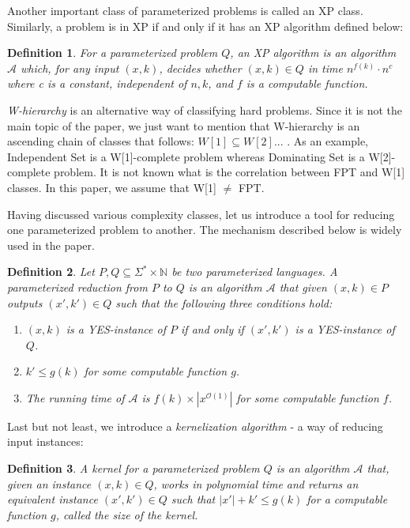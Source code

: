 \documentclass[en]{pracamgr}
\newtheorem{definition}{Definition}
\newcommand{\domsetp}{{\sc Dominating Set}}
\newcommand{\indset}{{\sc Independent Set}}
\begin{document}
Another important class of parameterized problems is called an XP class. Similarly, a problem is in XP if and only if it has an XP algorithm defined below:

\begin{definition}
	For a parameterized problem $Q$, an \textup{XP algorithm} is an algorithm $\mathcal{A}$ which, for any input $(x,k)$, decides whether $(x,k) \in Q$ in time $n^{f(k)}\cdot n^c$ where c is a constant, independent of $n,k$, and $f$ is a computable function.
\end{definition}

\emph{W-hierarchy} is an alternative way of classifying hard problems. Since it is not the main topic of the paper, we just want to mention that W-hierarchy is an ascending chain of classes that follows: $W[1] \subseteq W[2]...$ . As an example, \indset{} is a W[1]-complete problem whereas \domsetp{} is a W[2]-complete problem. It is not known what is the correlation between FPT and W[1] classes. In this paper, we assume that W[1] $\neq$ FPT. 

Having discussed various complexity classes, let us introduce a tool for reducing one parameterized problem to another. The mechanism described below is widely used in the paper.

\begin{definition}
	Let $P,Q \subseteq \Sigma^* \times \mathbb{N}$ be two parameterized languages. A  \textup{parameterized reduction} from $P$ to $Q$ is an algorithm $\mathcal{A}$ that given $(x,k) \in P$ outputs $(x',k') \in Q$ such that the following three conditions hold:
	\begin{enumerate}
		\item $(x,k)$ is a YES-instance of $P$ if and only if $(x',k')$ is a YES-instance of $Q$.
		\item $k' \leq g(k)$ for some computable function $g$.
		\item The running time of $\mathcal{A}$ is $f(k) \times |x^{\mathcal{O}(1)}|$ for some computable function $f$.
	\end{enumerate}
\end{definition}

Last but not least, we introduce a \emph{kernelization algorithm} - a way of reducing input instances:

\begin{definition}\label{Kernel}
	A \textup{kernel} for a parameterized problem $Q$ is an algorithm $\mathcal{A}$ that, given an instance $(x,k) \in Q$, works in polynomial time and returns an equivalent instance $(x',k') \in Q$
	such that $|x'| + k' \leq g(k)$ for a computable function $g$, called the \textup{size} of the kernel.
\end{definition}
\end{document}
